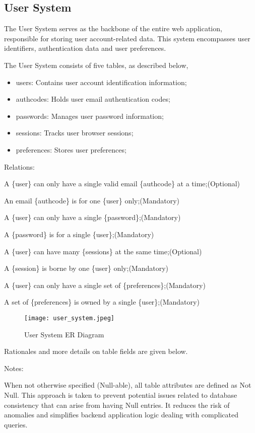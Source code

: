 \documentclass[12pt]{report}
\newcommand{\n}{\par}
\newcommand{\br}{\n\vspace{1 em}\n}
\begin{document}
\subsection{User System} \label{data-layer.design.user-system}
The User System serves as the backbone of the entire web application, responsible for storing user account-related data.
This system encompasses user identifiers, authentication data and user preferences.
\br
The User System consists of five tables, as described below,
\begin{itemize}
	\item users: Contains user account identification information;
	\item authcodes: Holds user email authentication codes;
	\item passwords: Manages user password information;
	\item sessions: Tracks user browser sessions;
	\item preferences: Stores user preferences;
\end{itemize}
Relations:\n
A \{user\} can only have a single valid email \{authcode\} at a time;\null\hfill (Optional)\n
An email \{authcode\} is for one \{user\} only;\null\hfill (Mandatory)
\br
A \{user\} can only have a single \{password\};\null\hfill (Mandatory)\n
A \{password\} is for a single \{user\};\null\hfill (Mandatory)
\br
A \{user\} can have many \{sessions\} at the same time;\null\hfill (Optional)\n
A \{session\} is borne by one \{user\} only;\null\hfill (Mandatory)
\br
A \{user\} can only have a single set of \{preferences\};\null\hfill (Mandatory)\n
A set of \{preferences\} is owned by a single \{user\};\null\hfill (Mandatory)
\br
\begin{figure}[h!]
	\centering
	\texttt{[image: user\_system.jpeg]}
	\caption{User System ER Diagram}
	\label{fig:user-system-er}
\end{figure}
\br
Rationales and more details on table fields are given below.\n
Notes:\n
When not otherwise specified (Null-able), all table attributes are defined as Not Null.
This approach is taken to prevent potential issues related to database consistency that can arise from having Null entries.
It reduces the risk of anomalies and simplifies backend application logic dealing with complicated queries.
\end{document}
